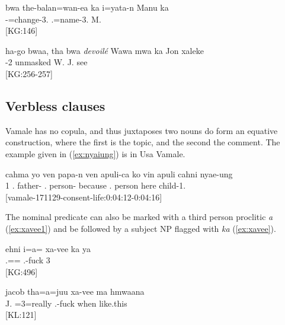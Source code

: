 \ea\label{ex:bwa_disc}
\gll bwa the-balan=wan-ea ka i=yata-n Manu ka\\ 
  -=change-3.  .=name-3. M. \\ 
\glt {} {[KG:146]}
\z

\ea\label{ex:bwa_disc2}
\gll ha-go bwaa, tha bwa \textit{devoilé} Wawa mwa ka Jon xaleke\\ 
 -2    unmasked W.   J. see\\ 
\glt {} {[KG:256-257]}
\z

\subsection{Verbless clauses}
\label{ssec:Verbless_clauses}

Vamale has no copula, and thus juxtaposes two nouns do form an equative construction, where the first is the topic, and the second the comment. The example given in (\ref{ex:nyaiung}) is in Usa Vamale. 

\ea \label{ex:nyaiung}
\gll cahma yo ven papa-n ven apuli-ca {ko} {vin} {apuli} {cahni} {nyae}-{ung}\\ 
  1 . father- . person- because . person here child-1.\\ 
\glt {} {[vamale-171129-consent-life:0:04:12-0:04:16]}
\z

The nominal predicate can also be marked with a third person proclitic \textit{a} (\ref{ex:xavee1}) and be followed by a subject NP flagged with \textit{ka}  (\ref{ex:xavee}).

\ea \label{ex:xavee}
\gll ehni i=a= xa-vee ka ya\\   .== .-fuck  3\\ 
\glt {} {[KG:496]}
\z

\ea \label{ex:xavee1}
\gll jacob tha=a=juu xa-vee ma hmwaana\\ 
 J. =3=really .-fuck when like.this\\ 
\glt {} {[KL:121]}
\z

